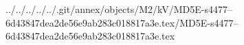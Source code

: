 ../../../../../.git/annex/objects/M2/kV/MD5E-s4477--6d43847dea2de56e9ab283c018817a3e.tex/MD5E-s4477--6d43847dea2de56e9ab283c018817a3e.tex